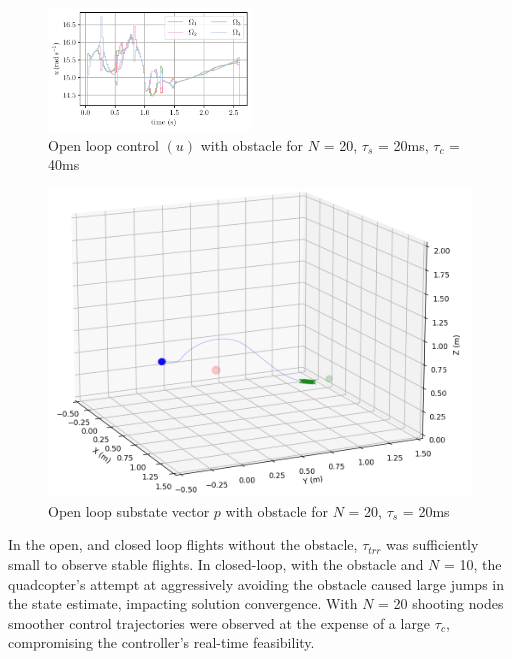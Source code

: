\documentclass[conference]{IEEEtran}
\begin{document}
\begin{figure}[t!]
    \includegraphics[width=0.48\textwidth]{figures/u.pdf}
    \caption{Open loop control $(u)$ with obstacle for $N$ = 20, $\tau_s$ = 20ms, $\tau_c$ = 40ms}  \label{fig_comp_zeta_u_AGV}
\end{figure}

\begin{figure}[htbp]
	\centerline{\includegraphics[scale = 0.4]{figures/Screenshot_OLwO_ST.png} }
	\caption{Open loop substate vector $p$ with obstacle for $N$ = 20, $\tau_s$ = 20ms}
	\label{Fig4}
\end{figure}

In the open, and closed loop flights without the obstacle, $\tau_{trr}$ was sufficiently small to observe stable flights. In closed-loop, with the obstacle and $N$ = 10, the quadcopter's attempt at aggressively avoiding the obstacle caused large jumps in the state estimate, impacting solution convergence. With $N$ = 20 shooting nodes smoother control trajectories were observed at the expense of a large $\tau_{c}$, compromising the controller's real-time feasibility.

\end{document}
